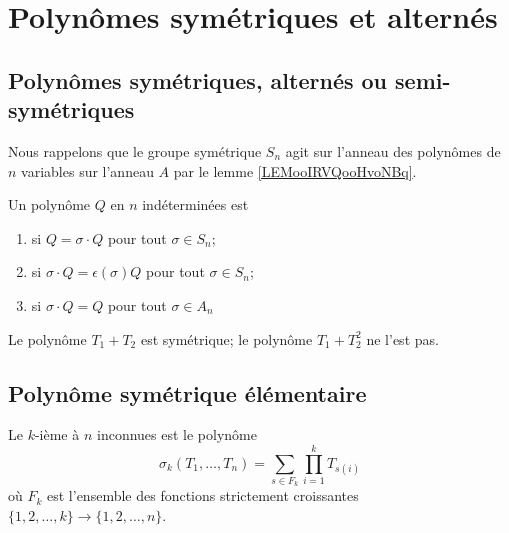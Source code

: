 \section{Polynômes symétriques et alternés}

\subsection{Polynômes symétriques, alternés ou semi-symétriques}


Nous rappelons que le groupe symétrique \( S_n\) agit sur l'anneau des polynômes de \( n\) variables sur l'anneau \( A\) par le lemme \ref{LEMooIRVQooHvoNBq}.

\begin{definition}
	Un polynôme \( Q\) en \( n\) indéterminées est
	\begin{enumerate}
		\item
		       si \( Q=\sigma\cdot Q\) pour tout \( \sigma\in S_n\);
		\item
		       si \( \sigma\cdot Q=\epsilon(\sigma)Q\) pour tout \( \sigma\in S_n\);
		\item
		       si \( \sigma\cdot Q=Q\) pour tout \( \sigma\in A_n\)
	\end{enumerate}
\end{definition}
Le polynôme \( T_1+T_2\) est symétrique; le polynôme \( T_1+T_2^2\) ne l'est pas.

\subsection{Polynôme symétrique élémentaire}

\begin{definition}  \label{DEFooTREUooZKoXeg}
	Le \( k\)-ième  à \( n\) inconnues est le polynôme
	\begin{equation}
		\sigma_k(T_1,\ldots, T_n)=\sum_{s\in F_k}\prod_{i=1}^kT_{s(i)}
	\end{equation}
	où \( F_k\) est l'ensemble des fonctions strictement croissantes \( \{ 1,2,\ldots, k \}\to\{ 1,2,\ldots, n \}\).
\end{definition}


